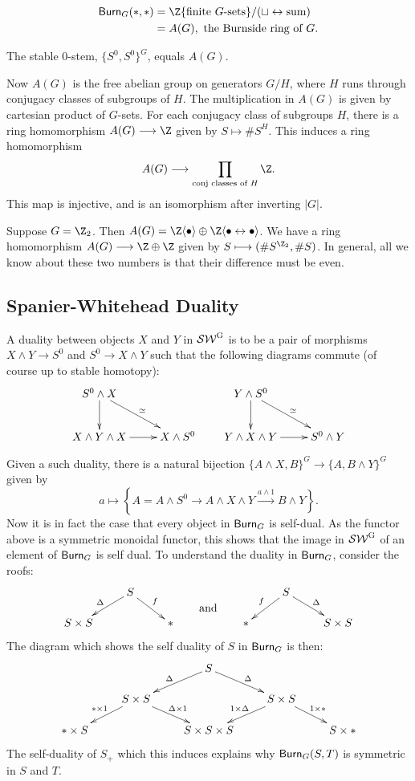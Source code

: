 \documentclass[11pt]{article}
\begin{document}
\begin{ThirdWeek}
\begin{exmp*}
\begin{align*}
\Burnside_G(*,*)&=\Z\{\text{finite $G$-sets}\}/({\displaystyle\sqcup\leftrightarrow\text{sum}})\\
&=A(G),\text{ the Burnside ring of $G$.}
\end{align*}
\end{exmp*}
\begin{cor*}
The stable $0$-stem, $\{S^0,S^0\}^G$, equals $A(G)$.
\end{cor*}
Now $A(G)$ is the free abelian group on generators $G/H$, where $H$ runs through conjugacy classes of subgroups of $H$. The multiplication in $A(G)$ is given by cartesian product of $G$-sets. For each conjugacy class of subgroups $H$, there is a ring homomorphism $A(G)\to\Z$ given by $S\mapsto \# S^H$. This induces a ring homomorphism
\[A(G)\to\prod_\text{conj classes of $H$}\Z.\]
This map is injective, and is an isomorphism after inverting $|G|$.
\begin{exmp*}
Suppose $G=\Z_2$. Then $A(G)=\Z\langle\bullet\rangle\oplus \Z\langle\bullet\leftrightarrow\bullet\rangle$. We have a ring homomorphism $A(G)\to\Z\oplus\Z$ given by $S\mapsto(\#S^{\Z_2},\#S)$. In general, all we know about these two numbers is that their difference must be even.
\end{exmp*}
\subsection*{Spanier-Whitehead Duality}
\begin{defn*}
A duality between objects $X$ and $Y$ in $\operatorname{{\mathcal{SW}^G}}$ is to be a pair of morphisms $X\wedge Y\to S^0$ and $S^0\to X\wedge Y$ such that the following diagrams commute (of course up to stable homotopy):
\[\xymatrix{
S^0\wedge X\ar[d]\ar[dr]^\simeq\\
X\wedge Y\wedge X\ar[r]&X\wedge S^0
}
\qquad\xymatrix{
Y\wedge S^0\ar[d]\ar[dr]^\simeq\\
Y\wedge X\wedge Y\ar[r]&S^0\wedge Y
}\]
\end{defn*}
Given a such duality, there is a natural bijection
$\{A\wedge X,B\}^G\to\{A,B\wedge Y\}^G$ given by
\[a\mapsto\left\{A=A\wedge S^0\to A\wedge X\wedge Y\overset{a\wedge1}{\to}B\wedge Y\right\}.\]
Now it is in fact the case that every object in $\operatorname{{\mathsf{Burn}}}_G$ is self-dual. As the functor above is a symmetric monoidal functor, this shows that the image in $\operatorname{{\mathcal{SW}^G}}$ of an element of $\operatorname{{\mathsf{Burn}}}_G$ is self dual. To understand the duality in $\operatorname{{\mathsf{Burn}}}_G$, consider the roofs:
\[\xymatrix@R=5mm{&S\ar[dl]_\Delta\ar[dr]^f\\S\times S&&\ast}
\qquad\raisebox{-.5cm}{\text{and}}\qquad
\xymatrix@R=5mm{&S\ar[dl]_f\ar[dr]^\Delta\\\ast&&S\times S}\]
The diagram which shows the self duality of $S$ in $\operatorname{{\mathsf{Burn}}}_G$ is then:
\[\xymatrix@R=5mm{
&&S\ar[ld]_\Delta\ar[rd]^\Delta\\
&S\times S\ar[ld]_{\ast\times1}\ar[rd]^{\Delta\times1}&&S\times S\ar[ld]_{1\times\Delta}\ar[rd]^{1\times\ast}\\
\ast\times S&&S\times S\times S&&S\times\ast
}\]
The self-duality of $S_+$ which this induces explains why $\operatorname{{\mathsf{Burn}}}_G(S,T)$ is symmetric in $S$ and $T$.


\end{ThirdWeek}
\end{document}
